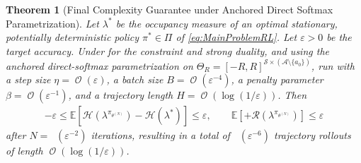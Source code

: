 \documentclass{article}
\theoremstyle{plain}
\newtheorem{theorem}{Theorem}[section]
\theoremstyle{definition}
\theoremstyle{remark}
\def\SS{{\mathcal{S}}}
\def\AA{{\mathcal{A}}}
\DeclareMathOperator{\OOTildeSym}{\widetilde{\mathcal{O}}}
\DeclareMathOperator{\OOSym}{\mathcal{O}}
\newcommand{\OOTilde}[1]{{\OOTildeSym\!\left(#1\right)}}
\newcommand{\OO}[1]{{\OOSym\!\left(#1\right)}}
\def\epsilon{{\varepsilon}}
\newcommand{\Exp}[1]{{ \mathbb{E}}\!\left[#1\right]}
\DeclarePairedDelimiter{\plus}{[}{]_{+}}
\def\xx{{\theta}}
\def\xxN{\xx^{(N)}}
\def\HH{{\mathcal{H}}}
\def\aa{{a}}
\def\Reg{{\mathcal{R}}}
\begin{document}
\begin{theorem}[Final Complexity Guarantee under Anchored Direct
  Softmax Parametrization]
 \label{thm:FinalComplexityAnchoredSoftmax}
 Let $\lambda^*$ be the occupancy measure of an optimal stationary,
 potentially deterministic policy $\pi^*\in\Pi$ of \eqref{eq:MainProblemRL}. Let $\epsilon>0$
 be the target accuracy. Under
  for the constraint and strong duality, and using the
 anchored direct-softmax parametrization on
 $\Theta_R=[-R,R]^{\SS\times(\AA\setminus\{\aa_0\})}$, run
  with a step size $\eta=\OO{\epsilon}$, a batch size
 $B=\OO{\epsilon^{-4}}$, a penalty parameter
 $\beta=\OO{\epsilon^{-1}}$, and a trajectory length
 $H=\OO{\log(1/\epsilon)}$. Then
 \begin{align*}
  -\epsilon
  \leq\Exp{\HH(\lambda^{\pi_{\xxN}})-\HH(\lambda^*)}
  \leq\epsilon,\qquad
  \Exp{\plus{\Reg(\lambda^{\pi_{\xxN}})}}\leq\epsilon
 \end{align*}
 after $N=\OOTilde{\epsilon^{-2}}$ iterations, resulting in a total
 of $\OOTilde{\epsilon^{-6}}$ trajectory rollouts of length
 $\OO{\log(1/\epsilon)}$.
\end{theorem}
\end{document}
